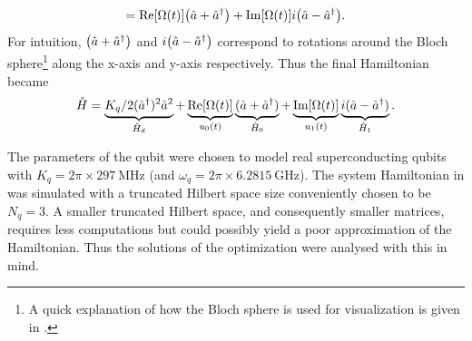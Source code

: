 \documentclass[main.tex]{subfiles}
\begin{document}
\[ = \text{Re}\qty[\Omega(t)]\qty(\hat{a} + \hat{a}^\dagger) + \text{Im}\qty[\Omega(t)]i\qty(\hat{a} - \hat{a}^\dagger). \]
For intuition, \( \qty(\hat{a} + \hat{a}^\dagger) \) and \( i\qty(\hat{a} - \hat{a}^\dagger) \) correspond to rotations around the Bloch sphere\footnote{A quick explanation of how the Bloch sphere is used for visualization is given in .} along the x-axis and y-axis respectively. 
Thus the final Hamiltonian became
\begin{equation}
    \hat{H} = \underbrace{K_q/2(\hat{a}^\dagger)^2\hat{a}^2}_{\hat{H}_d} + \underbrace{\text{Re}\qty[\Omega(t)]}_{u_0(t)}\underbrace{(\hat{a} + \hat{a}^\dagger)}_{\hat{H}_0} + \underbrace{\text{Im}\qty[\Omega(t)]}_{u_1(t)}\underbrace{i(\hat{a} - \hat{a}^\dagger)}_{\hat{H}_1} .
    \label{eq:system-hamiltonian-rotating}
\end{equation}

The parameters of the qubit were chosen to model real superconducting qubits with \( K_q = 2\pi\times\SI{297}{\mega\hertz} \) (and \( \omega_{q} = 2\pi\times\SI{6.2815}{\giga\hertz} \)).
The system Hamiltonian in  was simulated with a truncated Hilbert space size conveniently chosen to be \( N_q = 3 \).
A smaller truncated Hilbert space, and consequently smaller matrices, requires less computations but could possibly yield a poor approximation of the Hamiltonian.
Thus the solutions of the optimization were analysed with this in mind.
\end{document}
